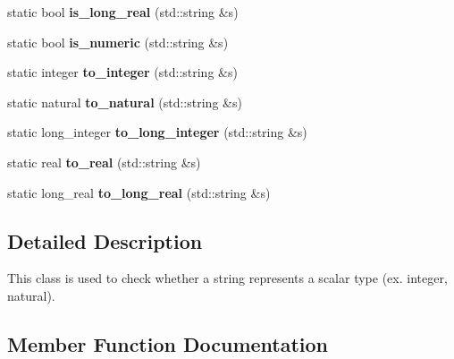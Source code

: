 \begin{DoxyCompactItemize}
static bool {\bfseries is\+\_\+long\+\_\+real} (std\+::string \&s)
\item 
\mbox{\label{classez_1_1essential_1_1Types_a76e2d45715c40470c592cd81efc2614b}} 
static bool {\bfseries is\+\_\+numeric} (std\+::string \&s)
\item 
\mbox{\label{classez_1_1essential_1_1Types_ab429c26188905a37c02ba6feacf25202}} 
static integer {\bfseries to\+\_\+integer} (std\+::string \&s)
\item 
\mbox{\label{classez_1_1essential_1_1Types_a9450b2c0a4fc9f164a4db149e698a412}} 
static natural {\bfseries to\+\_\+natural} (std\+::string \&s)
\item 
\mbox{\label{classez_1_1essential_1_1Types_a6f7c2272b66760b74710fd1b273f73a9}} 
static long\+\_\+integer {\bfseries to\+\_\+long\+\_\+integer} (std\+::string \&s)
\item 
\mbox{\label{classez_1_1essential_1_1Types_ab35a439b40f77c3edf3324beb4e4f068}} 
static real {\bfseries to\+\_\+real} (std\+::string \&s)
\item 
\mbox{\label{classez_1_1essential_1_1Types_ac5a7ebc9d42def6bcac5a1fe18364c1c}} 
static long\+\_\+real {\bfseries to\+\_\+long\+\_\+real} (std\+::string \&s)
\end{DoxyCompactItemize}


\subsection{Detailed Description}
This class is used to check whether a string represents a scalar type (ex. integer, natural). 

\subsection{Member Function Documentation}
\mbox{\label{classez_1_1essential_1_1Types_ad46e322aa2c257713684c0590832e0cb}} 
